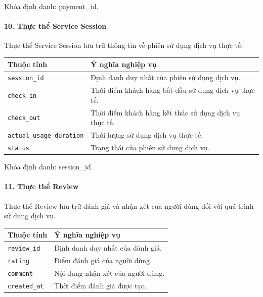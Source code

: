 Khóa định danh: payment\_id.

\paragraph{10. Thực thể Service Session}\mbox{}\par

Thực thể Service Session lưu trữ thông tin về phiên sử dụng dịch vụ thực tế.

\begin{center}
\scriptsize
\begin{tabular}{p{.25\linewidth} p{.65\linewidth}}
\toprule
Thuộc tính & Ý nghĩa nghiệp vụ \\
\midrule
\texttt{session\_id} & Định danh duy nhất của phiên sử dụng dịch vụ. \\
\texttt{check\_in} & Thời điểm khách hàng bắt đầu sử dụng dịch vụ thực tế. \\
\texttt{check\_out} & Thời điểm khách hàng kết thúc sử dụng dịch vụ thực tế. \\
\texttt{actual\_usage\_duration} & Thời lượng sử dụng dịch vụ thực tế. \\
\texttt{status} & Trạng thái của phiên sử dụng dịch vụ. \\
\bottomrule
\end{tabular}
\end{center}

Khóa định danh: session\_id.

\paragraph{11. Thực thể Review}\mbox{}\par

Thực thể Review lưu trữ đánh giá và nhận xét của người dùng đối với quá trình sử dụng dịch vụ.

\begin{center}
\scriptsize
\begin{tabular}{p{.25\linewidth} p{.65\linewidth}}
\toprule
Thuộc tính & Ý nghĩa nghiệp vụ \\
\midrule
\texttt{review\_id} & Định danh duy nhất của đánh giá. \\
\texttt{rating} & Điểm đánh giá của người dùng. \\
\texttt{comment} & Nội dung nhận xét của người dùng. \\
\texttt{created\_at} & Thời điểm đánh giá được tạo. \\
\bottomrule
\end{tabular}
\end{center}

